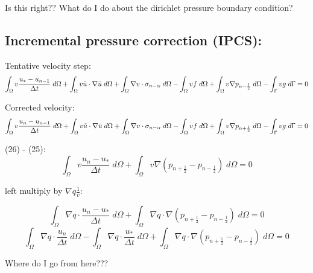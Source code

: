 \documentclass[11pt,a4paper]{article}
\begin{document}
Is this right?? What do I do about the dirichlet pressure boundary condition?

\subsection{Incremental pressure correction (IPCS):}

Tentative velocity step:
\begin{dmath}
  \int_\Omega v \frac{u_* - u_{n-1}}{\Delta t} \; d\Omega + \int_\Omega v \tilde{u} \cdot \nabla \bar{u} \; d\Omega + \int_\Omega \nabla v \cdot \sigma_{n-\alpha} \; d\Omega - \int_\Omega v f \; d\Omega + \int_\Omega v \nabla p_{n-\frac{1}{2}} \; d\Omega - \int_\Upgamma v g \; d\Upgamma = 0
\end{dmath}

Corrected velocity:
\begin{dmath}
  \int_\Omega v \frac{u_n - u_{n-1}}{\Delta t} \; d\Omega + \int_\Omega v \tilde{u} \cdot \nabla \bar{u} \; d\Omega + \int_\Omega \nabla v \cdot \sigma_{n-\alpha} \; d\Omega - \int_\Omega v f \; d\Omega + \int_\Omega v \nabla p_{n+\frac{1}{2}} \; d\Omega - \int_\Upgamma v g \; d\Upgamma = 0
\end{dmath}

(26) - (25):
\begin{dmath}
  \int_\Omega v \frac{u_n - u_*}{\Delta t} \; d\Omega + \int_\Omega v \nabla \left(p_{n+\frac{1}{2}} - p_{n-\frac{1}{2}} \right) \; d\Omega = 0
\end{dmath}

left multiply by \begin{math}\nabla q \frac{1}{v}\end{math}:

\begin{dmath}
  \int_\Omega \nabla q \cdot \frac{u_n - u_*}{\Delta t} \; d\Omega + \int_\Omega \nabla q \cdot \nabla \left(p_{n+\frac{1}{2}} - p_{n-\frac{1}{2}} \right) \; d\Omega = 0
\end{dmath}
\begin{dmath}
  \int_\Omega \nabla q \cdot \frac{u_n}{\Delta t} \; d\Omega - \int_\Omega \nabla q \cdot \frac{u_*}{\Delta t} \; d\Omega + \int_\Omega \nabla q \cdot \nabla \left(p_{n+\frac{1}{2}} - p_{n-\frac{1}{2}} \right) \; d\Omega = 0
\end{dmath}

Where do I go from here???

\end{document}
